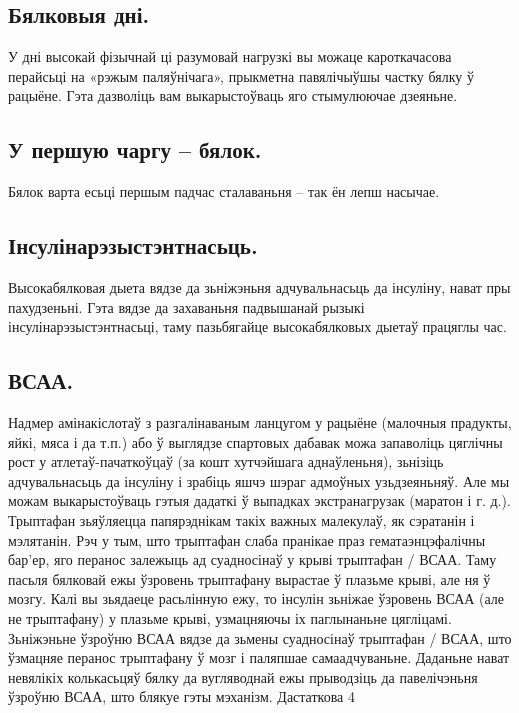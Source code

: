 \subsection{Бялковыя дні.}
У дні высокай фізычнай ці разумовай нагрузкі вы можаце кароткачасова перайсьці на «рэжым паляўнічага», прыкметна павялічыўшы частку бялку ў рацыёне. Гэта дазволіць вам выкарыстоўваць яго стымулюючае дзеяньне.

\subsection{У першую чаргу – бялок.}
Бялок варта есьці першым падчас сталаваньня – так ён лепш насычае.

\subsection{Інсулінарэзыстэнтнасьць.}
Высокабялковая дыета вядзе да зьніжэньня адчувальнасьць да інсуліну, нават пры пахудзеньні. Гэта вядзе да захаваньня падвышанай рызыкі інсулінарэзыстэнтнасьці, таму пазьбягайце высокабялковых дыетаў працяглы час.

\subsection{ВСАА.}
Надмер амінакіслотаў з разгалінаваным ланцугом у рацыёне (малочныя прадукты, яйкі, мяса і да т.п.) або ў выглядзе спартовых дабавак можа запаволіць цяглічны рост у атлетаў-пачаткоўцаў (за кошт хутчэйшага аднаўленьня), зьнізіць адчувальнасьць да інсуліну і зрабіць яшчэ шэраг адмоўных узьдзеяньняў. Але мы можам выкарыстоўваць гэтыя дадаткі ў выпадках экстранагрузак (маратон і г. д.). Трыптафан зьяўляецца папярэднікам такіх важных малекулаў, як сэратанін і мэлятанін. Рэч у тым, што трыптафан слаба пранікае праз гематаэнцэфалічны бар'ер, яго перанос залежыць ад суадносінаў у крыві трыптафан / ВСАА. Таму пасьля бялковай ежы ўзровень трыптафану вырастае ў плазьме крыві, але ня ў мозгу. Калі вы зьядаеце расьлінную ежу, то інсулін зьніжае ўзровень ВСАА (але не трыптафану) у плазьме крыві, узмацняючы іх паглынаньне цягліцамі. Зьніжэньне ўзроўню ВСАА вядзе да зьмены суадносінаў трыптафан / ВСАА, што ўзмацняе перанос трыптафану ў мозг і паляпшае самаадчуваньне. Даданьне нават невялікіх колькасьцяў бялку да вугляводнай ежы прыводзіць да павелічэньня ўзроўню ВСАА, што блякуе гэты мэханізм. Дастаткова 4%

